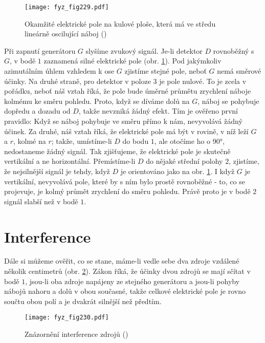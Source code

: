     \begin{figure}[ht!] %
      \centering
      \texttt{[image: fyz\_fig229.pdf]}
      \caption{Okamžité elektrické pole na kulové ploše, která má ve středu lineárně oscilující 
               náboj (\cite[s.~376]{Feynman01})}
      \label{fyz:fig229}
    \end{figure}

    Při zapnutí generátoru \(G\) slyšíme zvukový signál. Je-li detektor \(D\) rovnoběžný s \(G\), v 
    bodě \(1\) zaznamená silné elektrické pole (obr. \ref{fyz:fig229}). Pod jakýmkoliv azimutálním 
    úhlem vzhledem k ose \(G\) zjistíme stejné pole, neboť \(G\) nemá směrové účinky. Na druhé 
    straně, pro detektor v poloze \(3\) je pole nulové. To je zcela v pořádku, neboť náš vztah 
    říká, že pole bude úměrné průmětu zrychlení náboje kolmému ke směru pohledu. Proto, když se 
    díváme dolů na \(G\), náboj se pohybuje dopředu a dozadu od \(D\), takže nevzniká žádný efekt. 
    Tím je ověřeno první pravidlo: Když se náboj pohybuje ve směru přímo k nám, nevyvolává žádný 
    účinek. Za druhé, náš vztah říká, že elektrické pole má být v rovině, v níž leží \(G\) a \(r\), 
    kolmé na \(r\); takže, umístíme-li \(D\) do bodu \(1\), ale otočíme ho o \ang{90}, nedostaneme 
    žádný signál. Tak zjišťujeme, že elektrické pole je skutečně vertikální a ne horizontální. 
    Přemístíme-li \(D\) do nějaké střední polohy \(2\), zjistíme, že nejsilnější signál je tehdy, 
    když \(D\) je orientováno jako na obr. \ref{fyz:fig229}. I když \(G\) je vertikální,
    nevyvolává pole, které by s ním bylo prostě rovnoběžné - to, co se projevuje, je kolmý průmět 
    zrychlení do směru pohledu. Právě proto je v bodě \(2\) signál slabší než v bodě \(1\).
    
  \section{Interference}\label{fyz:IchapXXVIIIsecIV}
    Dále si můžeme ověřit, co se stane, máme-li vedle sebe dva zdroje vzdálené několik centimetrů 
    (obr. \ref{fyz:fig230}). Zákon říká, že účinky dvou zdrojů se mají sčítat v bodě \(1\), jsou-li 
    oba zdroje napájeny ze stejného generátoru a jsou-li pohyby nábojů nahoru a dolů v obou 
    současné, takže celkové elektrické pole je rovno součtu obou polí a je dvakrát silnější než 
    předtím.
    
    \begin{figure}[ht!] %
      \centering
      \texttt{[image: fyz\_fig230.pdf]}
      \caption{Znázornění interference zdrojů
               (\cite[s.~377]{Feynman01})}
      \label{fyz:fig230}
    \end{figure}
    
